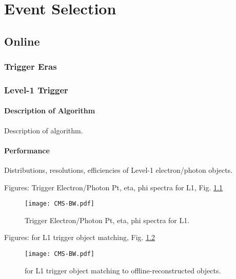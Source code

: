 \chapter{Event Selection}
\section{Online}
\subsection{Trigger Eras}
\subsection{Level-1 Trigger}
\subsubsection{Description of Algorithm}
Description of algorithm.  
\subsubsection{Performance}
Distributions, resolutions, efficiencies of Level-1 electron/photon objects.  

Figures: Trigger Electron/Photon Pt, eta, phi spectra for L1, Fig. \ref{fig:L1TriggerObjectSpectra}

 \begin{figure}[htb]
  \begin{center}
    \texttt{[image: CMS-BW.pdf]}
  \end{center}
  \caption[Trigger Electron/Photon Pt, eta, phi spectra for L1]{Trigger Electron/Photon Pt, eta, phi spectra for L1.}
  \label{fig:L1TriggerObjectSpectra}
 \end{figure}


Figures: \DR for L1 trigger object matching, Fig. \ref{fig:L1TriggerObjectDeltaR}

 \begin{figure}[htb]
  \begin{center}
    \texttt{[image: CMS-BW.pdf]}
  \end{center}
  \caption[\DR for L1 trigger object matching to offline]{\DR for L1 trigger object matching to offline-reconstructed objects.}
  \label{fig:L1TriggerObjectDeltaR}
 \end{figure}

